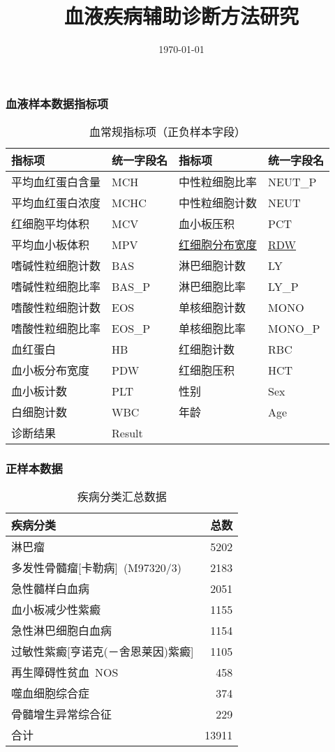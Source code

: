 \documentclass[UTF8,aspectratio=1610,10pt]{ctexbeamer}
\begin{document}
\title[Blood Diseases Diagnosis]{血液疾病辅助诊断方法研究}
\author[ ]{ }
\institute[math]{}
\date[ ]{\today}
\frame{\titlepage}

\begin{frame}
\frametitle{血液样本数据指标项}

\begin{table}
\centering
\caption{血常规指标项（正负样本字段）}
\begin{tabular}{|l|l||l|l|}
\toprule
指标项	&	统一字段名 & 指标项	&	统一字段名 \\
\midrule
平均血红蛋白含量	&	MCH	&	中性粒细胞比率	&	NEUT\_P	\\
平均血红蛋白浓度	&	MCHC	&	中性粒细胞计数	&	NEUT	\\
红细胞平均体积	&	MCV	&	血小板压积	&	PCT	\\
平均血小板体积	&	MPV	&	\underline{红细胞分布宽度}	&	\underline{RDW}	\\
嗜碱性粒细胞计数	&	BAS	&	淋巴细胞计数	&	LY	\\
嗜碱性粒细胞比率	&	BAS\_P	&	淋巴细胞比率	&	LY\_P	\\
嗜酸性粒细胞计数	&	EOS	&	单核细胞计数	&	MONO	\\
嗜酸性粒细胞比率	&	EOS\_P	&	单核细胞比率	&	MONO\_P	\\
血红蛋白	&	HB	&	红细胞计数	&	RBC	\\
血小板分布宽度	&	PDW	&	红细胞压积	&	HCT	\\
血小板计数	&	PLT	&	性别	&	Sex	\\
白细胞计数	&	WBC	&	年龄	&	Age	\\
诊断结果	&	Result	&		&	\\
\bottomrule
\end{tabular}
\end{table}

\end{frame}

\begin{frame}
\frametitle{正样本数据}
\begin{table}
\caption{疾病分类汇总数据}
\centering
\begin{tabular}{|l|r|}
\toprule
疾病分类	&	总数	\\
\midrule
淋巴瘤	&	5202	\\
多发性骨髓瘤[卡勒病] (M97320/3)	&	2183	\\
急性髓样白血病	&	2051	\\
血小板减少性紫癜	&	1155	\\
急性淋巴细胞白血病	&	1154	\\
过敏性紫癜[亨诺克(－舍恩莱因)紫癜]	&	1105	\\
再生障碍性贫血 NOS	&	458	\\
噬血细胞综合症	&	374	\\
骨髓增生异常综合征	&	229	\\
\bottomrule
合计	&	13911	\\
\bottomrule
\end{tabular}
\end{table}
\end{frame}
\end{document}
